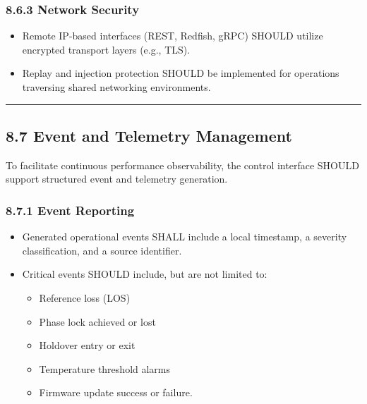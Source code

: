 \subsubsection{8.6.3 Network Security}\label{network-security}

\begin{itemize}
\tightlist
\item
  Remote IP-based interfaces (REST, Redfish, gRPC) SHOULD utilize
  encrypted transport layers (e.g., TLS).
\item
  Replay and injection protection SHOULD be implemented for operations
  traversing shared networking environments.
\end{itemize}

\begin{center}\rule{0.5\linewidth}{0.5pt}\end{center}

\subsection{8.7 Event and Telemetry
Management}\label{event-and-telemetry-management}

To facilitate continuous performance observability, the control
interface SHOULD support structured event and telemetry generation.

\subsubsection{8.7.1 Event Reporting}\label{event-reporting}

\begin{itemize}
\tightlist
\item
  Generated operational events SHALL include a local timestamp, a
  severity classification, and a source identifier.
\item
  Critical events SHOULD include, but are not limited to:

  \begin{itemize}
  \tightlist
  \item
    Reference loss (LOS)
  \item
    Phase lock achieved or lost
  \item
    Holdover entry or exit
  \item
    Temperature threshold alarms
  \item
    Firmware update success or failure.
  \end{itemize}
\end{itemize}

